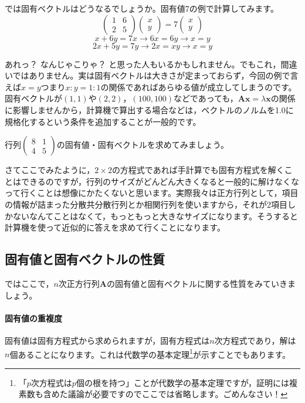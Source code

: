 \documentclass{ltjsbook}
\begin{document}
では固有ベクトルはどうなるでしょうか。固有値7の例で計算してみます。
\[ \begin{pmatrix} 1 & 6 \\ 2 & 5 \end{pmatrix}\begin{pmatrix} x\\y\end{pmatrix} = 7 \begin{pmatrix} x\\y\end{pmatrix} \]
\[ x + 6y = 7x \to 6x = 6y \to x=y \]
\[ 2x+5y = 7y \to 2x = xy \to x=y \]

あれっ？ なんじゃこりゃ？ と思った人もいるかもしれません。でもこれ，間違いではありません。実は固有ベクトルは大きさが定まっておらず，今回の例で言えば$x=y$つまり$x:y=1:1$の関係であればあらゆる値が成立してしまうのです。
固有ベクトルが$(1,1)$や$(2,2)$，$(100,100)$などであっても，$\bm{Ax}=\lambda \bm{x}$の関係に影響しませんから，計算機で算出する場合などは，ベクトルのノルムを1.0に規格化するという条件を追加することが一般的です。

\begin{reidai}{}{}
	行列$\begin{pmatrix}8&1\\4&5\end{pmatrix}$の固有値・固有ベクトルを求めてみましょう。
\end{reidai}
さてここでみたように，$2\times2$の方程式であれば手計算でも固有方程式を解くことはできるのですが，行列のサイズがどんどん大きくなると一般的に解けなくなって行くことは想像にかたくないと思います。実際我々は正方行列として，項目の情報が詰まった分散共分散行列とか相関行列を使いますから，それが2項目しかないなんてことはなくて，もっともっと大きなサイズになります。そうすると計算機を使って近似的に答えを求めて行くことになります。

\subsection{固有値と固有ベクトルの性質}
ではここで，$n$次正方行列$\bm{A}$の固有値と固有ベクトルに関する性質をみていきましょう。
\paragraph{固有値の重複度}

固有値は固有方程式から求められますが，固有方程式は$n$次方程式であり，解は$n$個あることになります。これは代数学の基本定理\footnote{「$p$次方程式は$p$個の根を持つ」ことが代数学の基本定理ですが，証明には複素数も含めた議論が必要ですのでここでは省略します。ごめんなさい！}が示すことでもあります。
\end{document}
